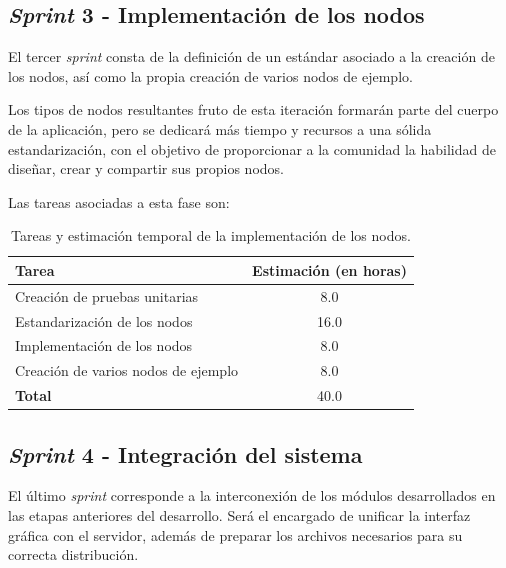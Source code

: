 \subsection{\textit{Sprint} 3 - Implementación de los nodos} \label{sub:sprint3}

El tercer \textit{sprint} consta de la definición de un estándar asociado a la creación de los nodos, así como la propia creación de varios nodos de ejemplo.\sn

Los tipos de nodos resultantes fruto de esta iteración formarán parte del cuerpo de la aplicación, pero se dedicará más tiempo y recursos a una sólida estandarización, con el objetivo de proporcionar a la comunidad la habilidad de diseñar, crear y compartir sus propios nodos.\sn

Las tareas asociadas a esta fase son:\sn

\begin{table}[ht]
    \begin{center}
        \begin{tabular}{| l | c |}
            \hline
            \textbf{Tarea} & \textbf{Estimación} (en horas) \\
            \hline
            Creación de pruebas unitarias       & 8.0 \\ \hline
            Estandarización de los nodos        & 16.0 \\ \hline
            Implementación de los nodos         & 8.0 \\ \hline
            Creación de varios nodos de ejemplo & 8.0 \\ \hline
            \textbf{Total}                      & 40.0 \\ \hline
        \end{tabular}
    \end{center}
    \caption{Tareas y estimación temporal de la implementación de los nodos.}
    \label{tab:phase6}
\end{table}

\subsection{\textit{Sprint} 4 - Integración del sistema} \label{sub:sprint4}

El último \textit{sprint} corresponde a la interconexión de los módulos desarrollados en las etapas anteriores del desarrollo. Será el encargado de unificar la interfaz gráfica con el servidor, además de preparar los archivos necesarios para su correcta distribución.\sn

